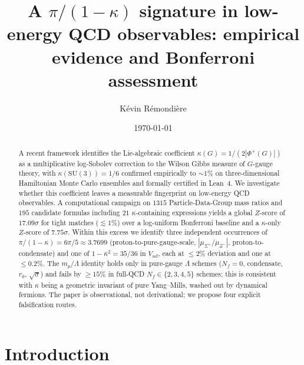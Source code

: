 \documentclass[aps,prl,reprint,amsmath,amssymb,nofootinbib,floatfix,superscriptaddress]{revtex4-2}
\newcommand{\SU}{\mathrm{SU}}
\newcommand{\Phiroots}{\Phi^{+}}
\begin{document}
\title{A $\pi/(1{-}\kappa)$ signature in low-energy QCD observables: empirical evidence and Bonferroni assessment}

\author{K\'evin R\'emondi\`ere}

\date{\today}

\begin{abstract}
A recent framework identifies the Lie-algebraic coefficient $\kappa(G) = 1/(2|\Phiroots(G)|)$ as a multiplicative log-Sobolev correction to the Wilson Gibbs measure of $G$-gauge theory, with $\kappa(\SU(3)) = 1/6$ confirmed empirically to ${\sim}1\%$ on three-dimensional Hamiltonian Monte Carlo ensembles and formally certified in Lean~4. We investigate whether this coefficient leaves a measurable fingerprint on low-energy QCD observables. A computational campaign on $1315$ Particle-Data-Group mass ratios and $195$ candidate formulas including $21$ $\kappa$-containing expressions yields a global $Z$-score of $17.09\sigma$ for tight matches ($\lesssim 1\%$) over a log-uniform Bonferroni baseline and a $\kappa$-only $Z$-score of $7.75\sigma$. Within this excess we identify three independent occurrences of $\pi/(1{-}\kappa) = 6\pi/5 \approx 3.7699$ (proton-to-pure-gauge-scale, $|\mu_{\Sigma^+}/\mu_{\Xi^-}|$, proton-to-condensate) and one of $1 - \kappa^2 = 35/36$ in $V_{ud}$, each at $\le 2\%$ deviation and one at $\le 0.2\%$. The $m_p/\Lambda$ identity holds only in pure-gauge $\Lambda$ schemes ($N_f{=}0$, condensate, $r_0$, $\sqrt{\sigma}$) and fails by $\ge 15\%$ in full-QCD $N_f \in \{2,3,4,5\}$ schemes; this is consistent with $\kappa$ being a geometric invariant of pure Yang--Mills, washed out by dynamical fermions. The paper is observational, not derivational; we propose four explicit falsification routes.
\end{abstract}

\maketitle

\section{Introduction}
\label{sec:intro}
\end{document}

